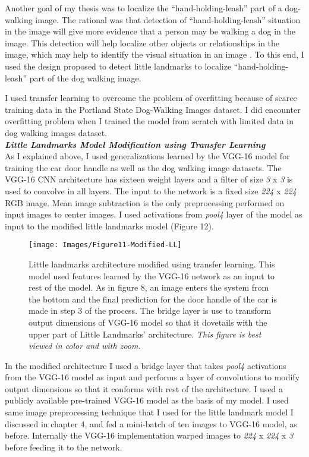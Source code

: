 \documentclass [11pt,letterpaper ,twoside ,openany ]{report}
\begin{document}
    Another goal of my thesis was to localize the ``hand-holding-leash'' part of a dog-walking image. The rational was that detection of ``hand-holding-leash'' situation in the image will give more evidence that a person may be walking a dog in the image. This detection will help localize other objects or relationships in the image, which may help to identify the visual situation in an image \cite{quinn2018semantic}. To this end, I used the design proposed to detect little landmarks \cite{Singh_2016_CVPR} to localize ``hand-holding-leash'' part of the dog walking image. 

    I used transfer learning to overcome the problem of overfitting because of scarce training data in the Portland State Dog-Walking Images dataset. I did encounter overfitting problem when I trained the model from scratch with limited data in dog walking images dataset. \\

    \noindent
    \textbf{\textit{Little Landmarks Model Modification using Transfer Learning}}\\                   
    As I explained above, I used generalizations learned by the VGG-16 model for training the car door handle as well as the dog walking image datasets.  The VGG-16 CNN architecture has sixteen weight layers and a filter of size \textit{3} x \textit{3} is used to convolve in all layers. The input to the network is a fixed size \textit{224} x \textit{224} RGB image. Mean image subtraction is the only preprocessing performed on input images to center images. I used activations from \textit{pool4} layer of the model as input to the modified little landmarks model (Figure 12).     

    \begin{figure}[h]
      \centering
      \texttt{[image: Images/Figure11-Modified-LL]}
      \caption{Little landmarks architecture modified using transfer learning. This model used features learned by the VGG-16 network as an input to rest of the model. As in figure 8, an image enters the system from the bottom and the final prediction for the door handle of the car is made in step 3 of the process. The bridge layer is use to transform output dimensions of VGG-16 model so that it dovetails with the upper part of Little Landmarks' architecture. \textit{This figure is best viewed in color and with zoom.}}
      \label{fig:tl_arch}
    \end{figure}        

    In the modified architecture I used a bridge layer that takes \textit{pool4} activations from the VGG-16 model as input and performs a layer of convolutions to modify output dimensions so that it conforms with rest of the architecture. I used a publicly available pre-trained VGG-16 model \cite{machrisaa2017} as the basis of my model. I used same image preprocessing technique that I used for the little landmark model I discussed in chapter 4, and fed a mini-batch of ten images to VGG-16 model, as before. Internally the VGG-16 implementation warped images to \textit{224} x \textit{224} x \textit{3} before feeding it to the network.    
\end{document}
